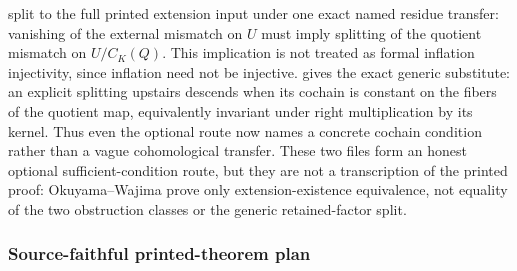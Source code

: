 \documentclass[11pt]{article}
\begin{document}
split to the full printed extension input under one exact named residue
transfer: vanishing of the external mismatch on \(U\) must imply splitting
of the quotient mismatch on \(U/C_K(Q)\).  This implication is not treated
as formal inflation injectivity, since inflation need not be injective.
 gives the exact
generic substitute: an explicit splitting upstairs descends when its
cochain is constant on the fibers of the quotient map, equivalently
invariant under right multiplication by its kernel.  Thus even the
optional route now names a concrete cochain condition rather than a vague
cohomological transfer.
These two files form an honest optional sufficient-condition route, but
they are not a transcription of the printed proof: Okuyama--Wajima prove
only extension-existence equivalence, not equality of the two obstruction
classes or the generic retained-factor split.

\subsubsection{Source-faithful printed-theorem plan}
\end{document}
